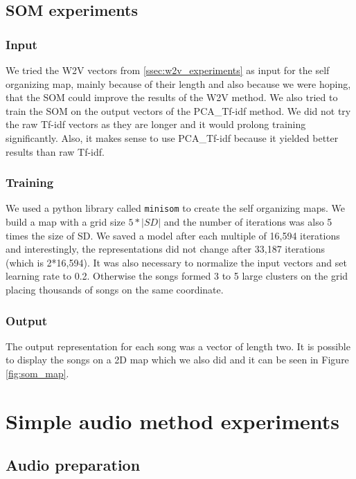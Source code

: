 \subsection{SOM experiments}\label{ssec:som_experiments}

\subsubsection{Input}
We tried the W2V vectors from \ref{ssec:w2v_experiments} as input for the self organizing map, mainly because of their length and also because we were hoping, that the SOM could improve the results of the W2V method. We also tried to train the SOM on the output vectors of the PCA\_Tf-idf method. We did not try the raw Tf-idf vectors as they are longer and it would prolong training significantly. Also, it makes sense to use PCA\_Tf-idf because it yielded better results than raw Tf-idf.

\subsubsection{Training}
We used a python library called \texttt{minisom} \cite{Vettigli2019} to create the self organizing maps. We build a map with a grid size $5*|SD|$ and the number of iterations was also 5 times the size of SD. We saved a model after each multiple of 16,594 iterations and interestingly, the representations did not change after 33,187 iterations (which is 2*16,594). It was also necessary to normalize the input vectors and set learning rate to 0.2. Otherwise the songs formed 3 to 5 large clusters on the grid placing thousands of songs on the same coordinate. 

\subsubsection{Output}
The output representation for each song was a vector of length two. It is possible to display the songs on a 2D map which we also did and it can be seen in Figure \ref{fig:som_map}. 

\section{Simple audio method experiments}\label{sec:simple_audio_experiments}

\subsection{Audio preparation}\label{ssec:audio_prep}


